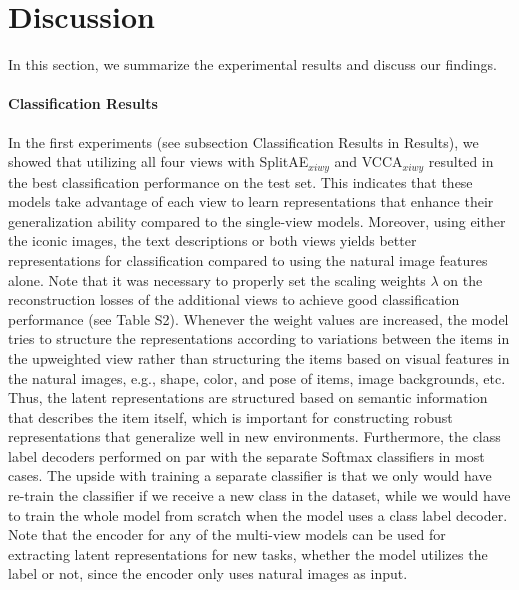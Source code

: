 \section{Discussion}\label{sec:discussion}

In this section, we summarize the experimental results and discuss our findings.

\paragraph{Classification Results} In the first experiments (see subsection Classification Results in Results),
we showed that utilizing all four views with SplitAE$_{x i w y}$ and VCCA$_{x i w y}$ resulted in the best classification performance on the test set. This indicates that these models take advantage of each view to learn representations that enhance their generalization ability compared to the single-view models. Moreover, using either the iconic images, the text descriptions or both views yields better representations for classification compared to using the natural image features alone. Note that it was necessary to properly set the scaling weights $\lambda$ on the reconstruction losses of the additional views to achieve good classification performance (see Table S2).
Whenever the weight values are increased, the model tries to structure the representations according to variations between the items in the upweighted view rather than structuring the items based on visual features in the natural images, e.g., shape, color, and pose of items, image backgrounds, etc. 
Thus, the latent representations are structured based on semantic information that describes the item itself, which is important for constructing robust representations that generalize well in new environments. Furthermore, the class label decoders performed on par with the separate Softmax classifiers in most cases. The upside with training a separate classifier is that we only would have re-train the classifier if we receive a new class in the dataset, while we would have to train the whole model from scratch when the model uses a class label decoder. Note that the encoder for any of the multi-view models can be used for extracting latent representations for new tasks, whether the model utilizes the label or not, since the encoder only uses natural images as input. 


